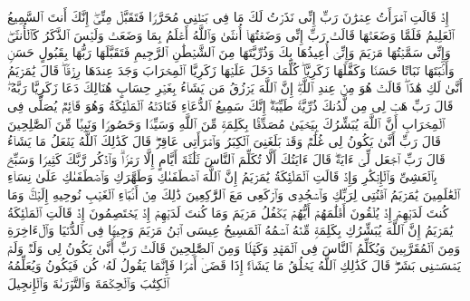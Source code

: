 \stopbuffer
\startbuffer[\q:3:35]
إِذۡ قَالَتِ ٱمۡرَأَتُ عِمۡرَٰنَ رَبِّ إِنِّی نَذَرۡتُ لَكَ مَا فِی بَطۡنِی مُحَرَّرࣰا فَتَقَبَّلۡ مِنِّیۤۖ إِنَّكَ أَنتَ ٱلسَّمِیعُ ٱلۡعَلِیمُ%
\stopbuffer
\startbuffer[\q:3:36]
فَلَمَّا وَضَعَتۡهَا قَالَتۡ رَبِّ إِنِّی وَضَعۡتُهَاۤ أُنثَىٰ وَٱللَّهُ أَعۡلَمُ بِمَا وَضَعَتۡ وَلَیۡسَ ٱلذَّكَرُ كَٱلۡأُنثَىٰۖ وَإِنِّی سَمَّیۡتُهَا مَرۡیَمَ وَإِنِّیۤ أُعِیذُهَا بِكَ وَذُرِّیَّتَهَا مِنَ ٱلشَّیۡطَٰنِ ٱلرَّجِیمِ%
\stopbuffer
\startbuffer[\q:3:37]
فَتَقَبَّلَهَا رَبُّهَا بِقَبُولٍ حَسَنࣲ وَأَنۢبَتَهَا نَبَاتًا حَسَنࣰا وَكَفَّلَهَا زَكَرِیَّاۖ كُلَّمَا دَخَلَ عَلَیۡهَا زَكَرِیَّا ٱلۡمِحۡرَابَ وَجَدَ عِندَهَا رِزۡقࣰاۖ قَالَ یَٰمَرۡیَمُ أَنَّىٰ لَكِ هَٰذَاۖ قَالَتۡ هُوَ مِنۡ عِندِ ٱللَّهِۖ إِنَّ ٱللَّهَ یَرۡزُقُ مَن یَشَاۤءُ بِغَیۡرِ حِسَابٍ%
\stopbuffer
\startbuffer[\q:3:38]
هُنَالِكَ دَعَا زَكَرِیَّا رَبَّهُۥۖ قَالَ رَبِّ هَبۡ لِی مِن لَّدُنكَ ذُرِّیَّةࣰ طَیِّبَةًۖ إِنَّكَ سَمِیعُ ٱلدُّعَاۤءِ%
\stopbuffer
\startbuffer[\q:3:39]
فَنَادَتۡهُ ٱلۡمَلَٰۤئِكَةُ وَهُوَ قَاۤئِمࣱ یُصَلِّی فِی ٱلۡمِحۡرَابِ أَنَّ ٱللَّهَ یُبَشِّرُكَ بِیَحۡیَىٰ مُصَدِّقَۢا بِكَلِمَةࣲ مِّنَ ٱللَّهِ وَسَیِّدࣰا وَحَصُورࣰا وَنَبِیࣰّا مِّنَ ٱلصَّٰلِحِینَ%
\stopbuffer
\startbuffer[\q:3:40]
قَالَ رَبِّ أَنَّىٰ یَكُونُ لِی غُلَٰمࣱ وَقَدۡ بَلَغَنِیَ ٱلۡكِبَرُ وَٱمۡرَأَتِی عَاقِرࣱۖ قَالَ كَذَٰلِكَ ٱللَّهُ یَفۡعَلُ مَا یَشَاۤءُ%
\stopbuffer
\startbuffer[\q:3:41]
قَالَ رَبِّ ٱجۡعَل لِّیۤ ءَایَةࣰۖ قَالَ ءَایَتُكَ أَلَّا تُكَلِّمَ ٱلنَّاسَ ثَلَٰثَةَ أَیَّامٍ إِلَّا رَمۡزࣰاۗ وَٱذۡكُر رَّبَّكَ كَثِیرࣰا وَسَبِّحۡ بِٱلۡعَشِیِّ وَٱلۡإِبۡكَٰرِ%
\stopbuffer
\startbuffer[\q:3:42]
وَإِذۡ قَالَتِ ٱلۡمَلَٰۤئِكَةُ یَٰمَرۡیَمُ إِنَّ ٱللَّهَ ٱصۡطَفَىٰكِ وَطَهَّرَكِ وَٱصۡطَفَىٰكِ عَلَىٰ نِسَاۤءِ ٱلۡعَٰلَمِینَ%
\stopbuffer
\startbuffer[\q:3:43]
یَٰمَرۡیَمُ ٱقۡنُتِی لِرَبِّكِ وَٱسۡجُدِی وَٱرۡكَعِی مَعَ ٱلرَّٰكِعِینَ%
\stopbuffer
\startbuffer[\q:3:44]
ذَٰلِكَ مِنۡ أَنۢبَاۤءِ ٱلۡغَیۡبِ نُوحِیهِ إِلَیۡكَۚ وَمَا كُنتَ لَدَیۡهِمۡ إِذۡ یُلۡقُونَ أَقۡلَٰمَهُمۡ أَیُّهُمۡ یَكۡفُلُ مَرۡیَمَ وَمَا كُنتَ لَدَیۡهِمۡ إِذۡ یَخۡتَصِمُونَ%
\stopbuffer
\startbuffer[\q:3:45]
إِذۡ قَالَتِ ٱلۡمَلَٰۤئِكَةُ یَٰمَرۡیَمُ إِنَّ ٱللَّهَ یُبَشِّرُكِ بِكَلِمَةࣲ مِّنۡهُ ٱسۡمُهُ ٱلۡمَسِیحُ عِیسَى ٱبۡنُ مَرۡیَمَ وَجِیهࣰا فِی ٱلدُّنۡیَا وَٱلۡءَاخِرَةِ وَمِنَ ٱلۡمُقَرَّبِینَ%
\stopbuffer
\startbuffer[\q:3:46]
وَیُكَلِّمُ ٱلنَّاسَ فِی ٱلۡمَهۡدِ وَكَهۡلࣰا وَمِنَ ٱلصَّٰلِحِینَ%
\stopbuffer
\startbuffer[\q:3:47]
قَالَتۡ رَبِّ أَنَّىٰ یَكُونُ لِی وَلَدࣱ وَلَمۡ یَمۡسَسۡنِی بَشَرࣱۖ قَالَ كَذَٰلِكِ ٱللَّهُ یَخۡلُقُ مَا یَشَاۤءُۚ إِذَا قَضَىٰۤ أَمۡرࣰا فَإِنَّمَا یَقُولُ لَهُۥ كُن فَیَكُونُ%
\stopbuffer
\startbuffer[\q:3:48]
وَیُعَلِّمُهُ ٱلۡكِتَٰبَ وَٱلۡحِكۡمَةَ وَٱلتَّوۡرَىٰةَ وَٱلۡإِنجِیلَ%
